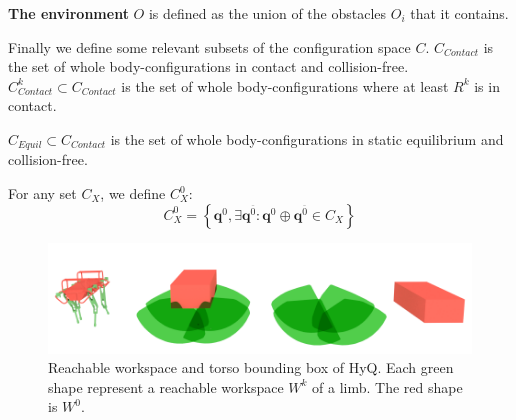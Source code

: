 
\medskip
\textbf{The environment} $O$ is defined as the union of the obstacles $O_i$ that it contains.

\medskip
Finally we define some relevant subsets of the configuration space $C$.
$C_{Contact}$ is the set of whole body-configurations in contact and collision-free.
$C_{Contact}^k \subset C_{Contact}$ is the set of whole body-configurations where at least $R^k$ is in contact.

\medskip
$C_{Equil} \subset C_{Contact}$ is the set of whole body-configurations in static equilibrium and collision-free.

\medskip
For any set $C_{X}$, we define $C_{X}^0$:
\begin{equation*}
  C_{X}^0 = \left\{ \mathbf{q}^{0},  \exists \mathbf{q}^{\overline{0}}: \mathbf{q}^0  \oplus \mathbf{q}^{\overline{0}} \in C_{X} \right\}
\end{equation*}

\begin{figure}
  \centering
  \includegraphics[width=0.95\linewidth]{figures/HyQ_roms}
  \caption{
           Reachable workspace and torso bounding box of HyQ. Each green shape represent a reachable workspace $W^k$ of a limb. The red shape is $W^0$.}
		   \label{fig:HyQ_roms}
\end{figure}
